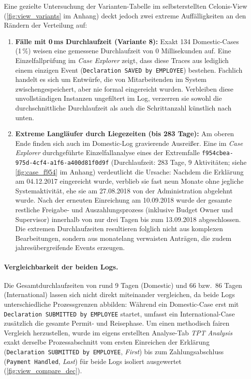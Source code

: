 Eine gezielte Untersuchung der Varianten-Tabelle im selbsterstellten Celonis-View (\autoref{fig:view_variants} im Anhang) deckt jedoch zwei extreme
Auffälligkeiten an den Rändern der Verteilung auf:
\begin{enumerate}[noitemsep]
	\item \textbf{Fälle mit 0\,ms Durchlaufzeit (Variante 8):} Exakt 134 Domestic-Cases (1\,\%) weisen eine gemessene Durchlaufzeit von 0 Millisekunden auf. Eine Einzelfallprüfung im \textit{Case Explorer} zeigt, dass diese Traces aus lediglich einem einzigen Event (\texttt{Declaration SAVED by EMPLOYEE}) bestehen. Fachlich handelt es sich um Entwürfe, die von Mitarbeitenden im System zwischengespeichert, aber nie formal eingereicht wurden. Verbleiben diese unvollständigen Instanzen ungefiltert im Log, verzerren sie sowohl die durchschnittliche Durchlaufzeit als auch die Schrittanzahl künstlich nach unten.
	\item \textbf{Extreme Langläufer durch Liegezeiten (bis 283 Tage):} Am oberen Ende finden sich auch im Domestic-Log gravierende Ausreißer. Eine im \textit{Case Explorer} durchgeführte Einzelfallanalyse eines der Extremfalle \texttt{f954cbea-975d-4cf4-a1f6-a400d81f0d9f} (Durchlaufzeit: 283 Tage, 9 Aktivitäten; siehe \autoref{fig:case_f954} im Anhang) verdeutlicht die Ursache: Nachdem die Erklärung am 04.12.2017 eingereicht wurde, verblieb sie fast neun Monate ohne jegliche Systemaktivität, ehe sie am 27.08.2018 von der Administration abgelehnt wurde. Nach der erneuten Einreichung am 10.09.2018 wurde der gesamte restliche Freigabe- und Auszahlungsprozess (inklusive Budget Owner und Supervisor) innerhalb von nur drei Tagen bis zum 13.09.2018 abgeschlossen. Die extremen Durchlaufzeiten resultieren folglich nicht aus komplexen Bearbeitungen, sondern aus monatelang verwaisten Anträgen, die zudem jahresübergreifende Events erzeugen.
\end{enumerate}

\paragraph{Vergleichbarkeit der beiden Logs.}
Die Gesamtdurchlaufzeiten von rund 9 Tagen (Domestic) und 66 bzw.\ 86 Tagen (International) lassen sich nicht direkt miteinander vergleichen, da beide Logs unterschiedliche Prozessgrenzen abbilden: Während ein Domestic-Case erst mit \texttt{Declaration SUBMITTED by EMPLOYEE} startet, umfasst ein International-Case zusätzlich die gesamte Permit- und Reisephase. Um einen methodisch fairen Vergleich herzustellen, wurde im eigens erstellten Analyse-Tab \textit{TPT Analysis} exakt derselbe Prozessabschnitt vom ersten Einreichen der Erklärung (\texttt{Declaration SUBMITTED by EMPLOYEE}, \textit{First}) bis zum Zahlungsabschluss (\texttt{Payment Handled}, \textit{Last}) für beide Logs isoliert ausgewertet (\autoref{fig:view_compare_dec}).

